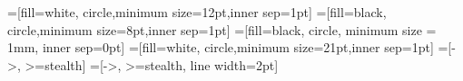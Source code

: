 \theoremstyle{definition}
\newtheorem{exo}{Exercice}
\newtheorem{example}{Exemple}

\newcommand{\IN}{{\mathbb N}}
\newcommand{\IQ}{{\mathbb Q}}
\newcommand{\IR}{{\mathbb R}}
\newcommand{\IZ}{{\mathbb Z}}
\newcommand{\IP}{{\mathbb P}}
\newcommand{\IC}{{\mathbb C}}
\newcommand{\bigo}{{\mathcal{O}}}
\renewcommand{\mod}{\bmod}
\newcommand{\ssi}{\Leftrightarrow}
\newcommand{\then}{\Rightarrow}
\newcommand{\suchthat}{~\big|~}
\newcommand{\floor}[1]{\left\lfloor #1 \right\rfloor}
\newcommand{\ceil}[1]{\left\lceil #1 \right\rceil}
\newcommand{\Dom}[1]{\mathrm{Dom}\left(#1\right)}
\newcommand{\Imm}[1]{\mathrm{Im}\left(#1\right)}
\DeclareMathOperator*{\argmin}{argmin}
\DeclareMathOperator*{\argmax}{argmax}
\DeclareMathOperator*{\asin}{asin}
\DeclareMathOperator*{\acos}{acos}
\DeclareMathOperator*{\atan}{atan}
\DeclareMathOperator*{\DIV}{\,div\,}

=[fill=white, circle,minimum size=12pt,inner sep=1pt]
=[fill=black, circle,minimum size=8pt,inner sep=1pt]
=[fill=black, circle, minimum size = 1mm, inner sep=0pt]
=[fill=white, circle,minimum size=21pt,inner sep=1pt]
=[->, >=stealth]
=[->, >=stealth, line width=2pt]

\newcommand{\cpp}{\texttt{C++}}
\newcommand{\java}{\texttt{Java}}